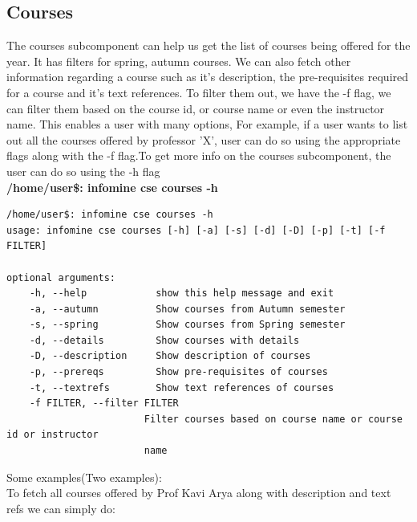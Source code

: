 \documentclass[12pt, letterpaper, twoside]{article}
\begin{document}
\subsection{Courses}
The courses subcomponent can help us get the list of courses being offered for the year. It has filters for spring, autumn courses.
We can also fetch other information regarding a course such as it's description, the pre-requisites required for a course and it's text references.
To filter them out, we have the -f flag, we can filter them based on the course id, or course name or even the instructor name. This enables a user
with many options, For example, if a user wants to list out all the courses offered by professor 'X', user can do so using the appropriate flags
along with the -f flag.To get more info on the courses subcomponent, the user can do so using the -h flag\\
\textbf{/home/user\$: infomine cse courses -h}\\
\begin{verbatim}
/home/user$: infomine cse courses -h
usage: infomine cse courses [-h] [-a] [-s] [-d] [-D] [-p] [-t] [-f FILTER]

optional arguments:
    -h, --help            show this help message and exit
    -a, --autumn          Show courses from Autumn semester
    -s, --spring          Show courses from Spring semester
    -d, --details         Show courses with details
    -D, --description     Show description of courses
    -p, --prereqs         Show pre-requisites of courses
    -t, --textrefs        Show text references of courses
    -f FILTER, --filter FILTER
                        Filter courses based on course name or course id or instructor
                        name
\end{verbatim}
Some examples(Two examples):\\
To fetch all courses offered by Prof Kavi Arya along with description and text refs we can simply do:
\end{document}
